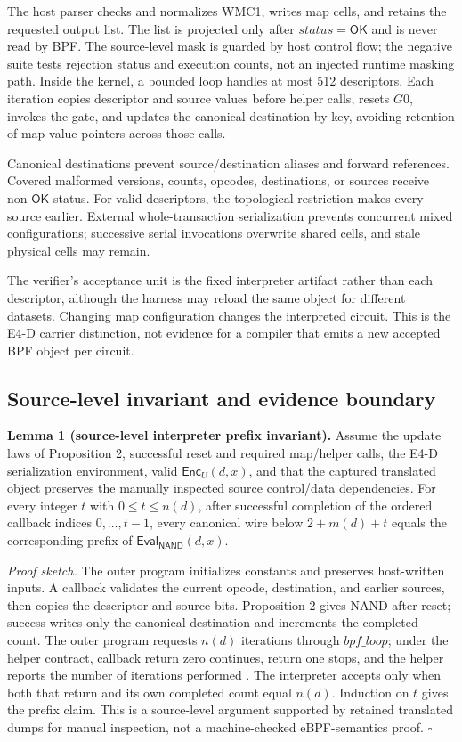 \documentclass[conference]{IEEEtran}
\begin{document}
The host parser checks and normalizes WMC1, writes map cells, and retains the requested output list. The list is projected only after $\mathit{status}=\mathsf{OK}$ and is never read by BPF. The source-level mask is guarded by host control flow; the negative suite tests rejection status and execution counts, not an injected runtime masking path. Inside the kernel, a bounded loop handles at most 512 descriptors. Each iteration copies descriptor and source values before helper calls, resets $G0$, invokes the gate, and updates the canonical destination by key, avoiding retention of map-value pointers across those calls.

Canonical destinations prevent source/destination aliases and forward references. Covered malformed versions, counts, opcodes, destinations, or sources receive non-$\mathsf{OK}$ status. For valid descriptors, the topological restriction makes every source earlier. External whole-transaction serialization prevents concurrent mixed configurations; successive serial invocations overwrite shared cells, and stale physical cells may remain.

The verifier's acceptance unit is the fixed interpreter artifact rather than each descriptor, although the harness may reload the same object for different datasets. Changing map configuration changes the interpreted circuit. This is the E4-D carrier distinction, not evidence for a compiler that emits a new accepted BPF object per circuit.

\subsection{Source-level invariant and evidence boundary}

\medskip
\noindent\textbf{Lemma 1 (source-level interpreter prefix invariant).}
Assume the update laws of Proposition 2, successful reset and required map/helper calls, the E4-D serialization environment, valid $\mathsf{Enc}_U(d,x)$, and that the captured translated object preserves the manually inspected source control/data dependencies. For every integer $t$ with $0\le t\le n(d)$, after successful completion of the ordered callback indices $0,\ldots,t-1$, every canonical wire below $2+m(d)+t$ equals the corresponding prefix of $\mathsf{Eval}_{\mathsf{NAND}}(d,x)$.

\emph{Proof sketch.} The outer program initializes constants and preserves host-written inputs. A callback validates the current opcode, destination, and earlier sources, then copies the descriptor and source bits. Proposition 2 gives NAND after reset; success writes only the canonical destination and increments the completed count. The outer program requests $n(d)$ iterations through $\mathit{bpf\_loop}$; under the helper contract, callback return zero continues, return one stops, and the helper reports the number of iterations performed \cite{ref26}. The interpreter accepts only when both that return and its own completed count equal $n(d)$. Induction on $t$ gives the prefix claim. This is a source-level argument supported by retained translated dumps for manual inspection, not a machine-checked eBPF-semantics proof. \hfill$\square$
\end{document}
